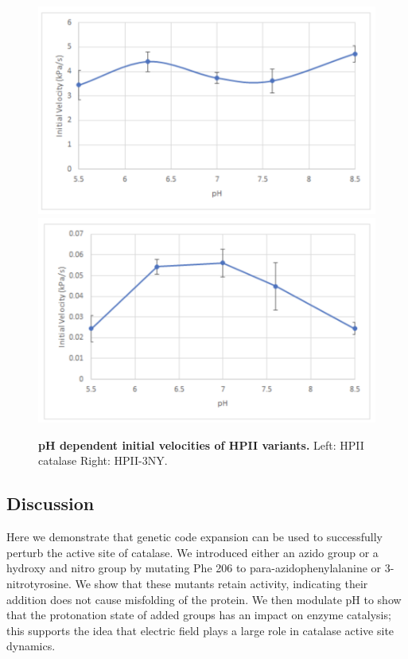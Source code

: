 \documentclass[9pt,twocolumn,twoside]{pnas-new}
\begin{document}
\begin{figure}
  \centering
  \includegraphics[width=0.9\linewidth]{figures/wildtype-velocity.png}
  \includegraphics[width=0.9\linewidth]{figures/3ny-velocity.png}
  \caption{\textbf{pH dependent initial velocities of HPII variants.} Left: HPII catalase Right: HPII-3NY.}
  \label{fig:ph-dependent-velocities}
\end{figure}

\subsection*{Discussion}
Here we demonstrate that genetic code expansion can be used to successfully perturb the active site of catalase. We introduced either an azido group or a hydroxy and nitro group by mutating Phe 206 to para-azidophenylalanine or 3-nitrotyrosine. We show that these mutants retain activity, indicating their addition does not cause misfolding of the protein. We then modulate pH to show that the protonation state of added groups has an impact on enzyme catalysis; this supports the idea that electric field plays a large role in catalase active site dynamics.\\
\end{document}
